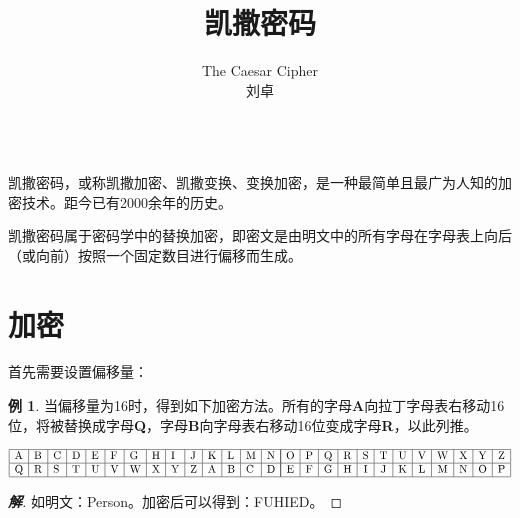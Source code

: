 \documentclass{article}
\date{}
\title{凯撒密码}
\author{
The Caesar Cipher\\
 刘卓\\
 \texttt{ } \\
}
\theoremstyle{definition}
\newtheorem{example}{\indent 例}
\newenvironment{solution}{\begin{proof}[\indent\bf 解]}{\end{proof}}
\begin{document}
\maketitle

凯撒密码，或称凯撒加密、凯撒变换、变换加密，是一种最简单且最广为人知的加密技术。距今已有2000余年的历史。

凯撒密码属于密码学中的替换加密，即密文是由明文中的所有字母在字母表上向后（或向前）按照一个固定数目进行偏移而生成。


\section{加密}

首先需要设置偏移量：

\begin{example}

当偏移量为16时，得到如下加密方法。所有的字母\textbf{A}向拉丁字母表右移动16位，将被替换成字母\textbf{Q}，字母\textbf{B}向字母表右移动16位变成字母\textbf{R}，以此列推。

$$
\begin{array}{|l|l|l|l|l|l|l|l|l|l|l|l|l|l|}
\hline \mathrm{A} & \mathrm{B} & \mathrm{C} & \mathrm{D} & \mathrm{E} & \mathrm{F} & \mathrm{G} & \mathrm{H} & \mathrm{I} & \mathrm{J} & \mathrm{K} & \mathrm{L} & \mathrm{M} & \mathrm{N} \\
\hline \mathrm{Q} & \mathrm{R} & \mathrm{S} & \mathrm{T} & \mathrm{U} & \mathrm{V} & \mathrm{W} & \mathrm{X} & \mathrm{Y} & \mathrm{Z} & \mathrm{A} & \mathrm{B} & \mathrm{C} & \mathrm{D} \\
\hline
\end{array}\\
\begin{array}{|c|c|c|c|c|c|c|c|c|c|c|c|}
\hline \mathrm{O} & \mathrm{P} & \mathrm{Q} & \mathrm{R} & \mathrm{S} & \mathrm{T} & \mathrm{U} & \mathrm{V} & \mathrm{W} & \mathrm{X} & \mathrm{Y} & \mathrm{Z} \\
\hline \mathrm{E} & \mathrm{F} & \mathrm{G} & \mathrm{H} & \mathrm{I} & \mathrm{J} & \mathrm{K} & \mathrm{L} & \mathrm{M} & \mathrm{N} & \mathrm{O} & \mathrm{P} \\
\hline
\end{array}
$$

\begin{solution}

如明文：Person。加密后可以得到：FUHIED。

\end{solution}
\end{example}
\end{document}
